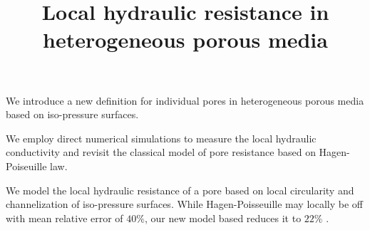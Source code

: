 \documentclass[draft]{agujournal2019}
\begin{document}
\title{Local hydraulic resistance in heterogeneous porous media}











\begin{keypoints}
\item We introduce a new definition for individual pores in heterogeneous porous media based on iso-pressure surfaces.
\item We employ direct numerical simulations to measure the local hydraulic conductivity and revisit the classical model of pore resistance based on Hagen-Poiseuille law. 
\item We model the local hydraulic resistance of a pore based on local circularity and channelization of iso-pressure surfaces. While Hagen-Poisseuille may locally be off with mean relative error of $40\%$, our new model based reduces it to $22\%$ .
\end{keypoints}
\end{document}

